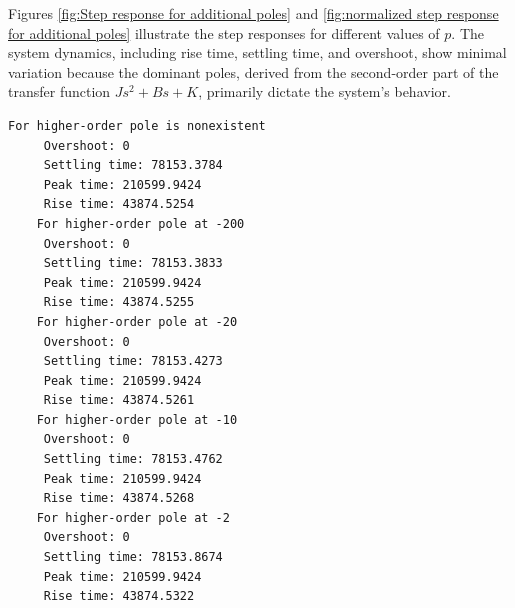 \documentclass[a4paper, 12pt, english]{article}
\begin{document}
\noindent
Figures \ref{fig:Step response for additional poles} and \ref{fig:normalized step response for additional poles} illustrate the step responses for different values of $p$. 
The system dynamics, including rise time, settling time, and overshoot, show minimal variation because the dominant poles, derived from the second-order part of the transfer function $ {J}{{s}^{2}} + {B}{s} + {K} $, primarily dictate the system's behavior.



\begin{lstlisting}[style=commandstyle,caption=Command line output]
    For higher-order pole is nonexistent
     Overshoot: 0
     Settling time: 78153.3784
     Peak time: 210599.9424
     Rise time: 43874.5254
    For higher-order pole at -200
     Overshoot: 0
     Settling time: 78153.3833
     Peak time: 210599.9424
     Rise time: 43874.5255
    For higher-order pole at -20
     Overshoot: 0
     Settling time: 78153.4273
     Peak time: 210599.9424
     Rise time: 43874.5261
    For higher-order pole at -10
     Overshoot: 0
     Settling time: 78153.4762
     Peak time: 210599.9424
     Rise time: 43874.5268
    For higher-order pole at -2
     Overshoot: 0
     Settling time: 78153.8674
     Peak time: 210599.9424
     Rise time: 43874.5322
\end{lstlisting}
\end{document}
